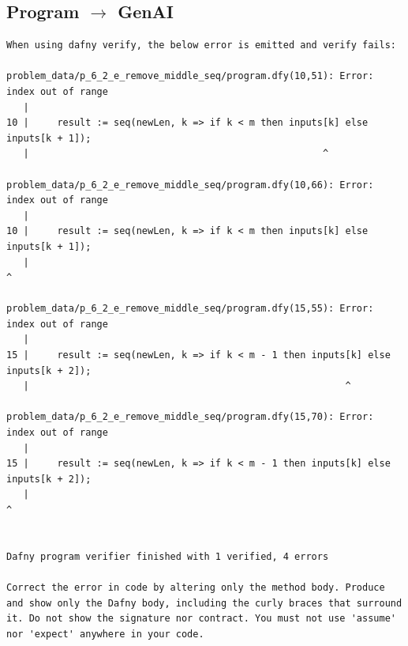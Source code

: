 \documentclass{article}
\begin{document}
\subsection*{Program $\rightarrow$ GenAI}
\begin{lstlisting}
When using dafny verify, the below error is emitted and verify fails:

problem_data/p_6_2_e_remove_middle_seq/program.dfy(10,51): Error: index out of range
   |
10 |     result := seq(newLen, k => if k < m then inputs[k] else inputs[k + 1]);
   |                                                    ^

problem_data/p_6_2_e_remove_middle_seq/program.dfy(10,66): Error: index out of range
   |
10 |     result := seq(newLen, k => if k < m then inputs[k] else inputs[k + 1]);
   |                                                                   ^

problem_data/p_6_2_e_remove_middle_seq/program.dfy(15,55): Error: index out of range
   |
15 |     result := seq(newLen, k => if k < m - 1 then inputs[k] else inputs[k + 2]);
   |                                                        ^

problem_data/p_6_2_e_remove_middle_seq/program.dfy(15,70): Error: index out of range
   |
15 |     result := seq(newLen, k => if k < m - 1 then inputs[k] else inputs[k + 2]);
   |                                                                       ^


Dafny program verifier finished with 1 verified, 4 errors

Correct the error in code by altering only the method body. Produce and show only the Dafny body, including the curly braces that surround it. Do not show the signature nor contract. You must not use 'assume' nor 'expect' anywhere in your code.
\end{lstlisting}
\end{document}
